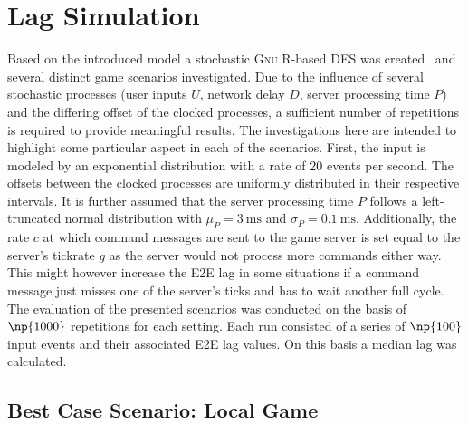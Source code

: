 \section{Lag Simulation}
\label{sec:simulation}

Based on the introduced model a stochastic \textsc{Gnu R}-based \gls{DES} was created~\cite{onlinegame-lag-sim-repo} and several distinct game scenarios investigated. Due to the influence of several stochastic processes (user inputs $U$, network delay $D$, server processing time $P$) and the differing offset of the clocked processes, a sufficient number of repetitions is required to provide meaningful results. The investigations here are intended to highlight some particular aspect in each of the scenarios. First, the input is modeled by an exponential distribution with a rate of $20$ events per second. The offsets between the clocked processes are uniformly distributed in their respective intervals. It is further assumed that the server processing time $P$ follows a left-truncated normal distribution with $\mu_P = \SI{3}{\milli\second}$ and $\sigma_P = \SI{0.1}{\milli\second}$. Additionally, the rate $c$ at which command messages are sent to the game server is set equal to the server's tickrate $g$ as the server would not process more commands either way. This might however increase the \gls{E2E} lag in some situations if a command message just misses one of the server's ticks and has to wait another full cycle. The evaluation of the presented scenarios was conducted on the basis of $\np{1000}$ repetitions for each setting. Each run consisted of a series of $\np{100}$ input events and their associated \gls{E2E} lag values. On this basis a median lag was calculated.


\subsection{Best Case Scenario: Local Game}
\label{subsec:local-game}

